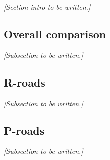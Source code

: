 \textit{[Section intro to be written.]}

\subsection{Overall comparison}
\label{sub:comparisonoverall}

\textit{[Subsection to be written.]}

\subsection{R-roads}
\label{sub:comparisonrroads}

\textit{[Subsection to be written.]}

\subsection{P-roads}
\label{sub:comparisonproads}

\textit{[Subsection to be written.]}